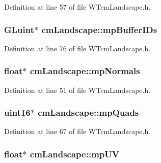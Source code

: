 Definition at line 57 of file WTcmLandscape.h.

\hypertarget{classcm_landscape_a4366dd85773f117e3ab18220552a8c69}{
\subsubsection[{mpBufferIDs}]{\setlength{\rightskip}{0pt plus 5cm}GLuint$\ast$ {\bf cmLandscape::mpBufferIDs}}}
\label{classcm_landscape_a4366dd85773f117e3ab18220552a8c69}


Definition at line 76 of file WTcmLandscape.h.

\hypertarget{classcm_landscape_ad246109fb99078e43310f481982017bb}{
\subsubsection[{mpNormals}]{\setlength{\rightskip}{0pt plus 5cm}float$\ast$ {\bf cmLandscape::mpNormals}}}
\label{classcm_landscape_ad246109fb99078e43310f481982017bb}


Definition at line 51 of file WTcmLandscape.h.

\hypertarget{classcm_landscape_a687c15e79989921c1962de385f31778c}{
\subsubsection[{mpQuads}]{\setlength{\rightskip}{0pt plus 5cm}uint16$\ast$ {\bf cmLandscape::mpQuads}}}
\label{classcm_landscape_a687c15e79989921c1962de385f31778c}


Definition at line 67 of file WTcmLandscape.h.

\hypertarget{classcm_landscape_a865c21a15cb293c915bcbf398c683641}{
\subsubsection[{mpUV}]{\setlength{\rightskip}{0pt plus 5cm}float$\ast$ {\bf cmLandscape::mpUV}}}
\label{classcm_landscape_a865c21a15cb293c915bcbf398c683641}


